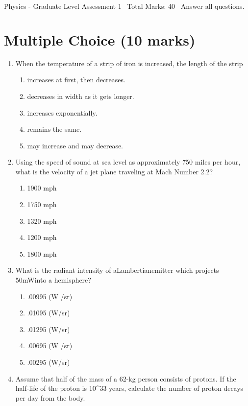 \documentclass[12pt]{article}
\begin{document}
\begin{center}
Physics - Graduate Level Assessment 1 \
Total Marks: 40 \
Answer all questions.
\end{center}

\section*{Multiple Choice (10 marks)}
\begin{enumerate}[label=\arabic*.]
\item When the temperature of a strip of iron is increased, the length of the strip
\begin{enumerate}[label=(\alph*)]
    \item increases at first, then decreases.
    \item decreases in width as it gets longer.
    \item increases exponentially.
    \item remains the same.
    \item may increase and may decrease.
\end{enumerate}
\item Using the speed of sound at sea level as approximately 750 miles per hour, what is the
velocity of a jet plane traveling at Mach Number 2.2?
\begin{enumerate}[label=(\alph*)]
    \item 1900 mph
    \item 1750 mph
    \item 1320 mph
    \item 1200 mph
    \item 1800 mph
\end{enumerate}
\item What is the radiant intensity of aLambertianemitter which projects 50mWinto a hemisphere?
\begin{enumerate}[label=(\alph*)]
    \item .00995 (W /sr)
    \item .01095 (W/sr)
    \item .01295 (W/sr)
    \item .00695 (W /sr)
    \item .00295 (W/sr)
\end{enumerate}
\item Assume that half of the mass of a 62-kg person consists of protons. If the half-life of
the proton is 10\^{}33 years, calculate the number of proton decays per day from the body.
\begin{enumerate}[label=(\alph*)]

\end{enumerate}
\end{enumerate}
\end{document}

